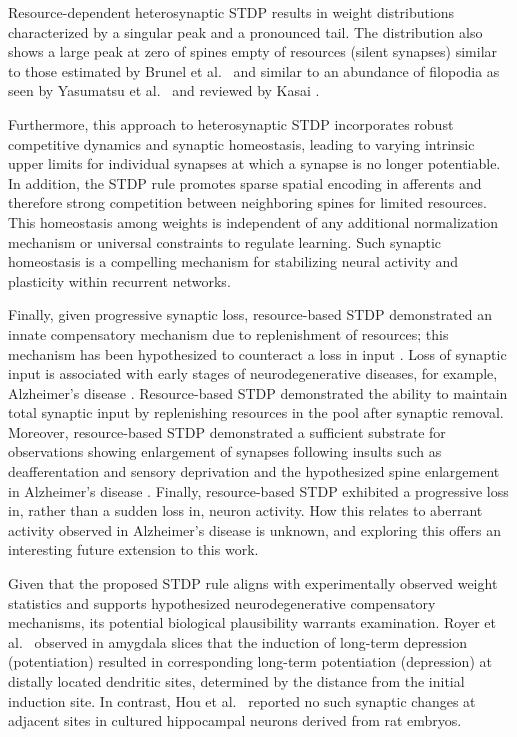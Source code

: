 \documentclass[utf8]{FrontiersinHarvard} %
\begin{document}
Resource-dependent heterosynaptic STDP results in weight distributions characterized by a singular peak and a pronounced tail. The distribution also shows a large peak at zero of spines empty of resources (silent synapses) similar to those estimated by Brunel et al.~\citeyearpar{Brunel.2004} and similar to an abundance of filopodia as seen by Yasumatsu et al.~\citeyearpar{Yasumatsu.2008g4n} and reviewed by Kasai \citeyearpar{KASAI.20239m}.

Furthermore, this approach to heterosynaptic STDP incorporates robust competitive dynamics and synaptic homeostasis, leading to varying intrinsic upper limits for individual synapses at which a synapse is no longer potentiable. In addition, the STDP rule promotes sparse spatial encoding in afferents and therefore strong competition between neighboring spines for limited resources. This homeostasis among weights is independent of any additional normalization mechanism or universal constraints to regulate learning. Such synaptic homeostasis is a compelling mechanism for stabilizing neural activity and plasticity within recurrent networks.

Finally, given progressive synaptic loss, resource-based STDP demonstrated an innate compensatory mechanism due to replenishment of resources; this mechanism has been hypothesized to counteract a loss in input \citep{Bhembre.2023}. Loss of synaptic input is associated with early stages of neurodegenerative diseases, for example, Alzheimer's disease \citep{Spires.2005}. Resource-based STDP demonstrated the ability to maintain total synaptic input by replenishing resources in the pool after synaptic removal. Moreover, resource-based STDP demonstrated a sufficient substrate for observations showing enlargement of synapses following insults such as deafferentation and sensory deprivation \citep{Chen.1982,Barnes.2017d2} and the hypothesized spine enlargement in Alzheimer's disease \citep{Bhembre.2023}. Finally, resource-based STDP exhibited a progressive loss in, rather than a sudden loss in, neuron activity. How this relates to aberrant activity observed in Alzheimer's disease \citep{Korzhova.2021} is unknown, and exploring this offers an interesting future extension to this work.

Given that the proposed STDP rule aligns with experimentally observed weight statistics and supports hypothesized neurodegenerative compensatory mechanisms, its potential biological plausibility warrants examination. Royer et al.~\citeyearpar{Royer.2003} observed in amygdala slices that the induction of long-term depression (potentiation) resulted in corresponding long-term potentiation (depression) at distally located dendritic sites, determined by the distance from the initial induction site. In contrast, Hou et al.~\citeyearpar{Hou.2008} reported no such synaptic changes at adjacent sites in cultured hippocampal neurons derived from rat embryos.
\end{document}
